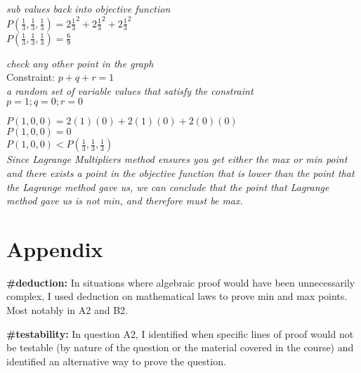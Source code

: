 \documentclass[11pt]{article}
\begin{document}
\emph{sub values back into objective function}\\
\(P(\frac{1}{3},\frac{1}{3},\frac{1}{3}) = 2\frac{1}{3}^2 + 2\frac{1}{3}^2 + 2\frac{1}{3}^2\)\\
\(P(\frac{1}{3},\frac{1}{3},\frac{1}{3}) = \frac{6}{9}\)

\emph{check any other point in the graph}\\
Constraint: \(p+q+r=1\)\\
\emph{a random set of variable values that satisfy the constraint}\\
\(p = 1; q = 0; r = 0\)

\(P(1,0,0) = 2(1)(0) + 2(1)(0) + 2(0)(0)\)\\
\(P(1,0,0) = 0\)\\
\(P(1,0,0) < P(\frac{1}{3},\frac{1}{3},\frac{1}{3})\)\\
\emph{Since Lagrange Multipliers method ensures you get either the max
or min point and there exists a point in the objective function that is
lower than the point that the Lagrange method gave us, we can conclude
that the point that Lagrange method gave us is not min, and therefore
must be max.}

    \section{Appendix}\label{appendix}

\textbf{\#deduction: } In situations where algebraic proof would have
been unnecessarily complex, I used deduction on mathematical laws to
prove min and max points. Most notably in A2 and B2.

\textbf{\#testability: } In question A2, I identified when specific
lines of proof would not be testable (by nature of the question or the
material covered in the course) and identified an alternative way to
prove the question.


    
    
    
    
\end{document}
